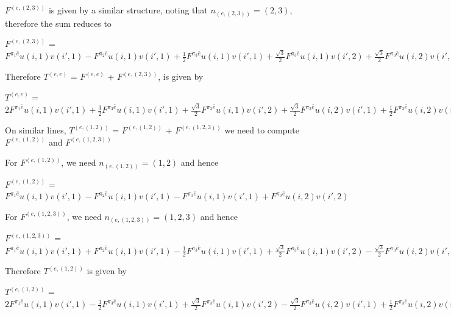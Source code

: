 $F^{(e,(2,3))}$ is given by a similar structure, noting that $n_{(e,(2,3))} = (2,3)$, therefore the sum reduces to
\begin{center}
$F^{(e,(2,3))}$ = $F^{\pi_{1}\bar{e}}u(i,1)v(i',1) - F^{\pi_{2}\bar{e}}u(i,1)v(i',1) 
              + \frac{1}{2}F^{\pi_{3}\bar{e}}u(i,1)v(i',1) + \frac{\sqrt{3}}{2}F^{\pi_{3}\bar{e}}u(i,1)v(i',2)
              + \frac{\sqrt{3}}{2}F^{\pi_{3}\bar{e}}u(i,2)v(i',1) - \frac{1}{2}F^{\pi_{3}\bar{e}}u(i,2)v(i',2)$
\end{center}

Therefore  $T^{(e,e)}$ = $F^{(e,e)}$ + $F^{(e,(2,3))}$, is given by \\
\begin{center}
$T^{(e,e)}$ = $2F^{\pi_{1}\bar{e}}u(i,1)v(i',1) + \frac{3}{2}F^{\pi_{3}\bar{e}}u(i,1)v(i',1) 
                    + \frac{\sqrt{3}}{2}F^{\pi_{3}\bar{e}}u(i,1)v(i',2) + \frac{\sqrt{3}}{2}F^{\pi_{3}\bar{e}}u(i,2)v(i',1) 
                    + \frac{1}{2}F^{\pi_{3}\bar{e}}u(i,2)v(i',2)$
\end{center}

On similar lines, $T^{(e,(1,2))}$ = $F^{(e,(1,2))}$ + $F^{(e,(1,2,3))}$ we need to compute $F^{(e,(1,2))}$ and $F^{(e,(1,2,3))}$

For $F^{(e,(1,2))}$, we need $n_{(e,(1,2))} = (1,2)$ and hence 
\begin{center}
$F^{(e,(1,2))}$ = $F^{\pi_{1}\bar{e}}u(i,1)v(i',1) - F^{\pi_{2}\bar{e}}u(i,1)v(i',1) 
              - F^{\pi_{3}\bar{e}}u(i,1)v(i',1) + F^{\pi_{3}\bar{e}}u(i,2)v(i',2)$
\end{center}
For $F^{(e,(1,2,3))}$, we need $n_{(e,(1,2,3))} = (1,2,3)$ and hence
\begin{center}
$F^{(e,(1,2,3))}$ = $F^{\pi_{1}\bar{e}}u(i,1)v(i',1) + F^{\pi_{2}\bar{e}}u(i,1)v(i',1) 
              - \frac{1}{2}F^{\pi_{3}\bar{e}}u(i,1)v(i',1) + \frac{\sqrt{3}}{2}F^{\pi_{3}\bar{e}}u(i,1)v(i',2)
              - \frac{\sqrt{3}}{2}F^{\pi_{3}\bar{e}}u(i,2)v(i',1) - \frac{1}{2}F^{\pi_{3}\bar{e}}u(i,2)v(i',2)$
\end{center}

Therefore $T^{(e,(1,2))}$ is given by 
\begin{center}
$T^{(e,(1,2))}$ = $2F^{\pi_{1}\bar{e}}u(i,1)v(i',1) - \frac{3}{2}F^{\pi_{3}\bar{e}}u(i,1)v(i',1) 
                    + \frac{\sqrt{3}}{2}F^{\pi_{3}\bar{e}}u(i,1)v(i',2) - \frac{\sqrt{3}}{2}F^{\pi_{3}\bar{e}}u(i,2)v(i',1) 
                    + \frac{1}{2}F^{\pi_{3}\bar{e}}u(i,2)v(i',2)$
\end{center}

